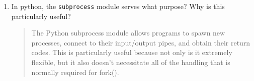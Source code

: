\documentclass[letterpaper,10pt,onecolumn,titlepage]{article}
\begin{document}
\begin{enumerate}[itemsep=0.1 in]
\item\label{last} In python, the \texttt{subprocess} module serves what purpose? Why is
  this particularly useful?

\begin{quote}
  The Python subprocess module allows programs to spawn new processes, connect to their input/output pipes, and obtain their return codes.  This is particularly useful because not only is it extremely flexible, but it also doesn't necessitate all of the handling that is normally required for fork().
\end{quote}

\end{enumerate}

\end{document}
